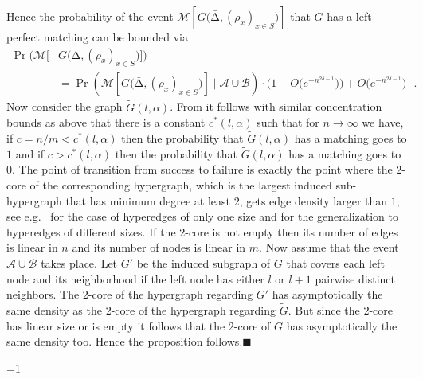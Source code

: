 \let\accentvec\vec \documentclass{llncs}
\newcommand{\proofEnd}{{\hfill\ensuremath{\blacksquare}}}
\newcommand{\keys}{\ensuremath{n}}
\newcommand{\cells}{\ensuremath{m}}
\newcommand{\pmf}{\ensuremath{{\rho}}}
\newcommand{\mean}{{\mathrm{\scriptstyle\Delta}}}
\newcommand{\Amean}{\bar{\mean}}
\newcommand{\blank}{\text{ }}
\newcommand{\graph}{\ensuremath{G}}
\newcommand{\graphWR}{\ensuremath{\tilde{G}}}
\newcommand{\low}{\ensuremath{l}}
\newcommand{\evM}{{\mathcal{M}}}
\newcommand{\evA}{{\mathcal{A}}}
\newcommand{\evB}{{\mathcal{B}}}
\begin{document}
Hence the probability of the event $\evM[ \graph   \big( \Amean,         ({\pmf}_x)_{x\in S} \big)]$ that $\graph$
has a left-perfect matching can be bounded via
\begin{equation*}
\begin{split}
\Pr\big( \evM[ &\graph   \big( \Amean,         ({\pmf}_x)_{x\in S} \big)] \big) \\
 &=\Pr\left( \evM[ \graph   \big( \Amean,         ({\pmf}_x)_{x\in S} \big)] \mid \evA \cup \evB \right) \cdot \Big(1-O\big(e^{-\keys^{2\delta-1}}\big)\Big)+O\big(e^{-\keys^{2\delta-1}}\big) \blank.
\end{split}
\end{equation*}
Now consider the graph $\graphWR (\low, \alpha )$. 
From \cite[Theorem 3]{DGMMPR_tight_2010} it follows with similar concentration bounds as above that
there is a constant $c^*(\low,\alpha)$ such that for $n\to \infty$ we have,
if $c={\keys}/{\cells}<c^*(\low,\alpha)$ then the probability
that $\graphWR (\low, \alpha)$ has a matching goes to $1$ and
if $c>c^*(\low,\alpha)$ then the probability that $\graphWR (\low, \alpha)$ has a matching  goes to $0$.
The point of transition from success to failure is exactly the point where the $2$-core of the corresponding
hypergraph, which is the largest induced sub-hypergraph that has minimum degree at least $2$,
gets edge density larger than $1$; see e.g.~\cite{FM_maximum_2009,FP_orientability_2010} for the case of
hyperedges of only one size and \cite{DGMMPR_tight_2009_full,DGMMPR_tight_2010} for the generalization to
hyperedges of different sizes. If the $2$-core is not empty then its number of edges
is linear in $\keys$ and its number of nodes is linear in $\cells$. Now assume that the event $\evA\cup \evB$ takes place.
Let $\graph'$ be the induced subgraph of $\graph$ that covers each left node
and its neighborhood if the left node has either $\low$ or $\low+1$ pairwise distinct
neighbors.
The $2$-core of the hypergraph regarding $\graph'$ has asymptotically the same density as
the $2$-core of the hypergraph regarding $\graphWR$. 
But since the $2$-core has linear size or is empty it follows that the $2$-core of $\graph$ has asymptotically the same density too.
Hence the proposition follows.\proofEnd
\fi



\def\addendum{0}
\ifnum\addendum=1
\end{document}

